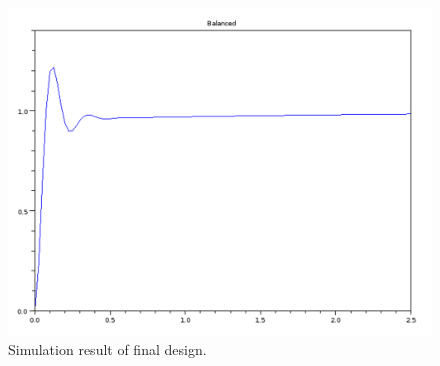 \begin{figure}\centering
\includegraphics[width=4.5in]{figs10/final_design_step_respa.png}
\caption{Simulation result of final design.}\label{FinalDesignSim}
\end{figure}





